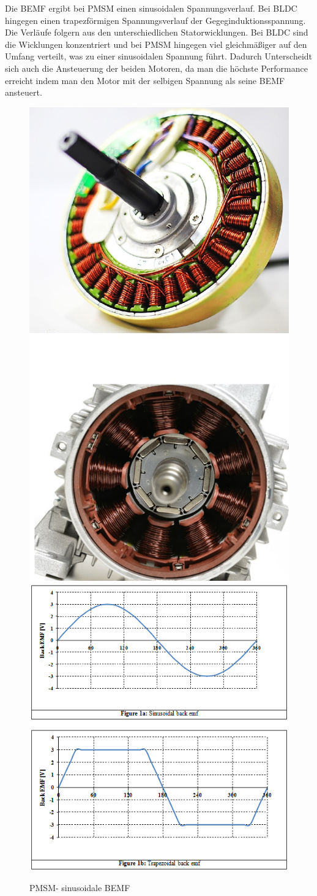 \begin{description}[leftmargin=3cm]
							\item[Unterschied zur PMSM]
							Die BEMF ergibt bei PMSM einen sinusoidalen Spannungsverlauf. Bei BLDC hingegen einen trapezförmigen Spannungsverlauf der Gegeginduktionsspannung. Die Verläufe folgern aus den unterschiedlichen Statorwicklungen. Bei BLDC sind die Wicklungen konzentriert und bei PMSM hingegen viel gleichmäßiger auf den Umfang verteilt, was zu einer sinusoidalen Spannung führt. Dadurch Unterscheidt sich auch die Ansteuerung der beiden Motoren, da man die höchste Performance erreicht indem man den Motor mit der selbigen Spannung als seine BEMF ansteuert.
							\begin{figure}[h]
								\centering 
								\includegraphics[width=0.27\linewidth]{./pics/el/bldcpmsm}
								\includegraphics[width=0.45\linewidth]{./pics/el/sinus}
								\caption{PMSM- sinusoidale BEMF}
							\end{figure}
						\end{description}
	
